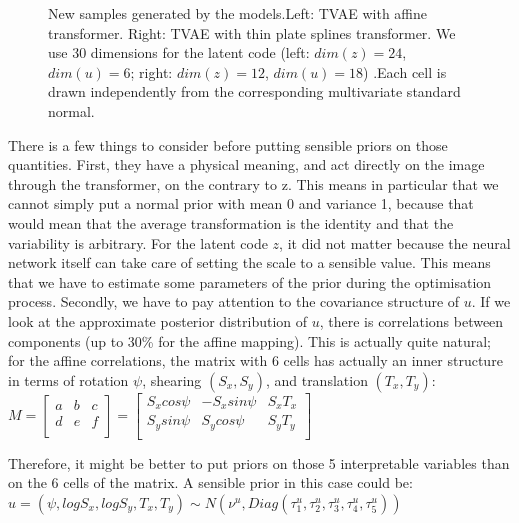 \documentclass[letterpaper, twoside]{article}
\begin{document}
\begin{figure}[h]
\begin{minipage}{.33\textwidth}
\begin{tabular}{|@{}c@{}|}
\end{tabular}
\end{minipage}%
\caption{New samples generated by the models.Left: TVAE with affine transformer. Right: TVAE with thin plate splines transformer. We use 30 dimensions for the latent code (left: $dim(z) = 24$, $dim(u) = 6$; right: $dim(z) = 12$, $dim(u) = 18$) .Each cell is drawn independently from the corresponding multivariate standard normal.}
\label{generatedafftps}
\end{figure}

There is a few things to consider before putting sensible priors on those quantities. First, they have a physical meaning, and act directly on the image through the transformer, on the contrary to z. This means in particular that we cannot simply put a normal prior with mean 0 and variance 1, because that would mean that the average transformation is the identity and that the variability is arbitrary. For the latent code $z$, it did not matter because the neural network itself can take care of setting the scale to a sensible value. This means that we have to estimate some parameters of the prior during the optimisation process. Secondly, we have to pay attention to the covariance structure of $u$. If we look at the approximate posterior distribution of $u$, there is correlations between components (up to 30\% for the affine mapping). This is actually quite natural; for the affine correlations, the matrix with 6 cells has actually an inner structure in terms of rotation $\psi$, shearing $(S_x, S_y)$, and translation $(T_x, T_y)$:\\

$M=
  \left[ {\begin{array}{ccc}
   a & b & c\\
   d & e & f\\
  \end{array} } \right]
 = 
  \left[ {\begin{array}{ccc}
   S_x cos \psi & -S_x sin \psi & S_x T_x\\
   S_y sin \psi & S_y cos \psi & S_y T_y\\
  \end{array} } \right]$

  Therefore, it might be better to put priors on those 5 interpretable variables than on the 6 cells of the matrix. A sensible prior in this case could be:\\
  $u = (\psi, log S_x, log S_y, T_x, T_y) \sim N(\nu^u, Diag(\tau_1^u, \tau_2^u, \tau_3^u, \tau_4^u, \tau_5^u))$
\end{document}
